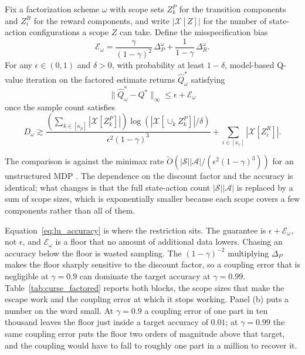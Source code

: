 \begin{theorem}[Lu et al. 2025, Theorem 5.1]
\label{thm:factored_complexity}
Fix a factorization scheme $\omega$ with scope sets $Z^P_k$ for the transition components and $Z^R_i$ for the reward components, and write $|\mathcal{X}[Z]|$ for the number of state-action configurations a scope $Z$ can take. Define the misspecification bias
\begin{equation}
\mathcal{E}_\omega = \frac{\gamma}{(1-\gamma)^2}\, \Delta_P^\omega + \frac{1}{1-\gamma}\, \Delta_R^\omega .
\label{eq:lu_bias}
\end{equation}
For any $\epsilon \in (0,1)$ and $\delta > 0$, with probability at least $1 - \delta$, model-based Q-value iteration on the factored estimate returns $\hat{Q}^*_\omega$ satisfying
\begin{equation}
\|\hat{Q}^*_\omega - Q^*\|_\infty \leq \epsilon + \mathcal{E}_\omega
\label{eq:lu_accuracy}
\end{equation}
once the sample count satisfies
\begin{equation}
D_\omega \gtrsim \frac{\left( \sum_{k \in [\kappa_p]} |\mathcal{X}[Z^P_k]| \right) \log\left( |\mathcal{X}[\cup_k Z^P_k]| / \delta \right)}{\epsilon^2 (1-\gamma)^3} + \sum_{i \in [\kappa_r]} |\mathcal{X}[Z^R_i]| .
\label{eq:lu_samples}
\end{equation}
\end{theorem}

The comparison is against the minimax rate $\tilde{O}(|\mathcal{S}||\mathcal{A}| / (\epsilon^2 (1-\gamma)^3))$ for an unstructured MDP \citep{azar2013}. The dependence on the discount factor and the accuracy is identical; what changes is that the full state-action count $|\mathcal{S}||\mathcal{A}|$ is replaced by a sum of scope sizes, which is exponentially smaller because each scope covers a few components rather than all of them.

Equation~\eqref{eq:lu_accuracy} is where the restriction sits. The guarantee is $\epsilon + \mathcal{E}_\omega$, not $\epsilon$, and $\mathcal{E}_\omega$ is a floor that no amount of additional data lowers. Chasing an accuracy below the floor is wasted sampling. The $(1-\gamma)^{-2}$ multiplying $\Delta_P$ makes the floor sharply sensitive to the discount factor, so a coupling error that is negligible at $\gamma = 0.9$ can dominate the target accuracy at $\gamma = 0.99$. Table~\ref{tab:curse_factored} reports both blocks, the scope sizes that make the escape work and the coupling error at which it stops working. Panel (b) puts a number on the word small. At $\gamma = 0.9$ a coupling error of one part in ten thousand leaves the floor just inside a target accuracy of $0.01$; at $\gamma = 0.99$ the same coupling error puts the floor two orders of magnitude above that target, and the coupling would have to fall to roughly one part in a million to recover it.

